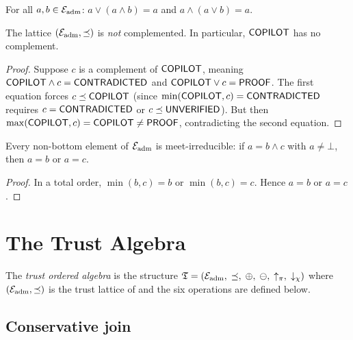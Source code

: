 \documentclass[11pt]{article}
\begin{document}
\begin{corollary}[Absorption]\label{cor:absorption}
For all $a, b \in \mathcal{E}_{\mathrm{adm}}$: $a \vee (a \wedge b) = a$ and
$a \wedge (a \vee b) = a$.
\end{corollary}

\begin{lemma}\label{lem:no-complement}
The lattice $(\mathcal{E}_{\mathrm{adm}}, \preceq)$ is \emph{not} complemented.
In particular, $\mathsf{COPILOT}$ has no complement.
\end{lemma}

\begin{proof}
Suppose $c$ is a complement of $\mathsf{COPILOT}$, meaning
$\mathsf{COPILOT} \wedge c = \mathsf{CONTRADICTED}$ and $\mathsf{COPILOT} \vee c = \mathsf{PROOF}$.
The first equation forces $c \preceq \mathsf{COPILOT}$ (since
$\min(\mathsf{COPILOT}, c) = \mathsf{CONTRADICTED}$ requires $c = \mathsf{CONTRADICTED}$
or $c \preceq \mathsf{UNVERIFIED}$).  But then $\max(\mathsf{COPILOT}, c) = \mathsf{COPILOT}
\neq \mathsf{PROOF}$, contradicting the second equation.
\end{proof}

\begin{lemma}\label{lem:meet-irred}
Every non-bottom element of $\mathcal{E}_{\mathrm{adm}}$ is meet-irreducible:
if $a = b \wedge c$ with $a \neq \bot$, then $a = b$ or $a = c$.
\end{lemma}

\begin{proof}
In a total order, $\min(b, c) = b$ or $\min(b, c) = c$.
Hence $a = b$ or $a = c$.
\end{proof}


\section{The Trust Algebra}\label{sec:algebra}

\begin{definition}\label{def:algebra}
The \emph{trust ordered algebra} is the structure
$\mathfrak{T} = (\mathcal{E}_{\mathrm{adm}},\;\preceq,\;\oplus,\;\ominus,\;\uparrow_\pi,\;\downarrow_\chi)$
where $(\mathcal{E}_{\mathrm{adm}}, \preceq)$ is the trust lattice of
 and the six operations are defined below.
\end{definition}

\subsection{Conservative join}\label{sec:join}
\end{document}
